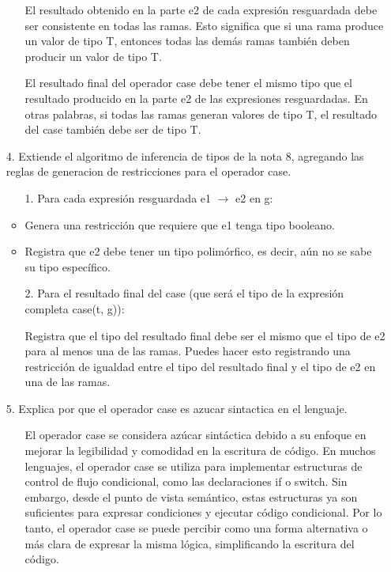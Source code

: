 \documentclass{article}
\begin{document}
\begin{itemize}
\begin{itemize}
            \item[ ] El resultado obtenido en la parte e2 de cada expresión resguardada debe ser consistente en todas las ramas. Esto significa que si una rama produce un valor de tipo T, entonces todas las demás ramas también deben producir un valor de tipo T.

            \item[ ] El resultado final del operador case debe tener el mismo tipo que el resultado producido en la parte e2 de las expresiones resguardadas. En otras palabras, si todas las ramas generan valores de tipo T, el resultado del case también debe ser de tipo T.
        \end{itemize}
        \item[4.] Extiende el algoritmo de inferencia de tipos de la nota 8, agregando las reglas de generacion de restricciones para el operador case.
        \begin{itemize}
            \item[1.] Para cada expresión resguardada e1 $\rightarrow$ e2 en g:

            \item Genera una restricción que requiere que e1 tenga tipo booleano.
            \item Registra que e2 debe tener un tipo polimórfico, es decir, aún no se sabe su tipo específico.

            \item[2.] Para el resultado final del case (que será el tipo de la expresión completa case(t, g)):

            \item[ ] Registra que el tipo del resultado final debe ser el mismo que el tipo de e2 para al menos una de las ramas. Puedes hacer esto registrando una restricción de igualdad entre el tipo del resultado final y el tipo de e2 en una de las ramas.
        \end{itemize}
        \item[5.] Explica por que el operador case es azucar sintactica en el lenguaje.
        \begin{itemize}
            \item[ ] El operador case se considera azúcar sintáctica debido a su enfoque en mejorar la legibilidad y comodidad en la escritura de código. En muchos lenguajes, el operador case se utiliza para implementar estructuras de control de flujo condicional, como las declaraciones if o switch. Sin embargo, desde el punto de vista semántico, estas estructuras ya son suficientes para expresar condiciones y ejecutar código condicional. Por lo tanto, el operador case se puede percibir como una forma alternativa o más clara de expresar la misma lógica, simplificando la escritura del código. 
        \end{itemize}
    \end{itemize}
\end{document}
